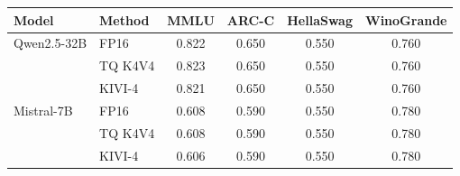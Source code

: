 \begin{tabular}{l l c c c c}
\toprule
Model & Method & MMLU & ARC-C & HellaSwag & WinoGrande \\
\midrule
Qwen2.5-32B & FP16 & 0.822 & 0.650 & 0.550 & 0.760 \\
 & TQ K4V4 & 0.823 & 0.650 & 0.550 & 0.760 \\
 & KIVI-4 & 0.821 & 0.650 & 0.550 & 0.760 \\
\midrule
Mistral-7B & FP16 & 0.608 & 0.590 & 0.550 & 0.780 \\
 & TQ K4V4 & 0.608 & 0.590 & 0.550 & 0.780 \\
 & KIVI-4 & 0.606 & 0.590 & 0.550 & 0.780 \\
\bottomrule
\end{tabular}
